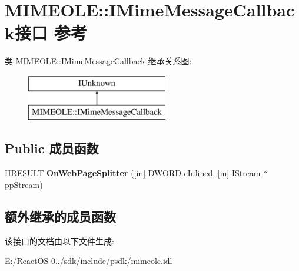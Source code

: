 \hypertarget{interface_m_i_m_e_o_l_e_1_1_i_mime_message_callback}{}\section{M\+I\+M\+E\+O\+LE\+:\+:I\+Mime\+Message\+Callback接口 参考}
\label{interface_m_i_m_e_o_l_e_1_1_i_mime_message_callback}
类 M\+I\+M\+E\+O\+LE\+:\+:I\+Mime\+Message\+Callback 继承关系图\+:\begin{figure}[H]
\begin{center}
\leavevmode
\includegraphics[height=2.000000cm]{interface_m_i_m_e_o_l_e_1_1_i_mime_message_callback}
\end{center}
\end{figure}
\subsection*{Public 成员函数}
\begin{DoxyCompactItemize}
\item 
\mbox{\label{interface_m_i_m_e_o_l_e_1_1_i_mime_message_callback_abd411021e819e7364a0fc0295b67a9dc}} 
H\+R\+E\+S\+U\+LT {\bfseries On\+Web\+Page\+Splitter} (\mbox{[}in\mbox{]} D\+W\+O\+RD c\+Inlined, \mbox{[}in\mbox{]} \hyperlink{interface_i_stream}{I\+Stream} $\ast$pp\+Stream)
\end{DoxyCompactItemize}
\subsection*{额外继承的成员函数}


该接口的文档由以下文件生成\+:\begin{DoxyCompactItemize}
\item 
E\+:/\+React\+O\+S-\/0../sdk/include/psdk/mimeole.\+idl\end{DoxyCompactItemize}
